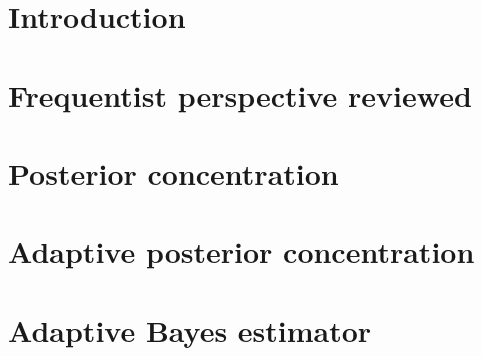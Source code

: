 \documentclass[english,fleqn]{beamer}%
\renewcommand{\1}{\mathbbm{1}}
\newcommand{\db}{\color{dblue}}
\theoremstyle{mydefi}
\theoremstyle{mynote}
\begin{document}
\newenvironment{DBliste}
{\begin{list}{\db\raisebox{0.2ex}{$\diamondsuit$}}
{\setlength{\itemsep}{1em}\setlength{\topsep}{0.5em}
 \setlength{\labelsep}{2ex}\setlength{\leftmargin}{4em}}}
{\end{list}}

\setcounter{framenumber}{0}

\section{Introduction}

\section{Frequentist perspective reviewed}

\section{Posterior concentration}

\section{Adaptive posterior concentration}

\section{Adaptive Bayes estimator}

\end{document}
